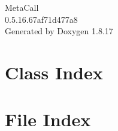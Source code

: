 \let\mypdfximage\pdfximage\def\pdfximage{\immediate\mypdfximage}\documentclass[twoside]{book}
\newcommand{\+}{\discretionary{\mbox{\scriptsize$\hookleftarrow$}}{}{}}
\newcommand{\clearemptydoublepage}{%
  \newpage{\pagestyle{empty}\cleardoublepage}%
}
\begin{document}
\begin{titlepage}
\vspace*{7cm}
\begin{center}%
{\Large Meta\+Call \\[1ex]\large 0.\+5.\+16.\+67af71d477a8 }\\
\vspace*{1cm}
{\large Generated by Doxygen 1.8.17}\\
\end{center}
\end{titlepage}
\clearemptydoublepage
{}
\tableofcontents
\clearemptydoublepage
{}

\chapter{Class Index}

\chapter{File Index}

\end{document}
